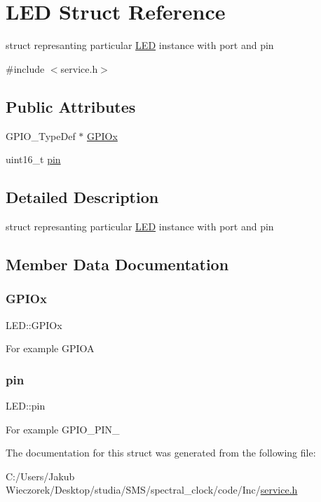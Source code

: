 \hypertarget{struct_l_e_d}{}\section{L\+ED Struct Reference}
\label{struct_l_e_d}


struct represanting particular \mbox{\hyperlink{struct_l_e_d}{L\+ED}} instance with port and pin  




{\ttfamily \#include $<$service.\+h$>$}

\subsection*{Public Attributes}
\begin{DoxyCompactItemize}
\item 
G\+P\+I\+O\+\_\+\+Type\+Def $\ast$ \mbox{\hyperlink{struct_l_e_d_a51708b925722c5a1d7360826fe72a9ab}{G\+P\+I\+Ox}}
\item 
uint16\+\_\+t \mbox{\hyperlink{struct_l_e_d_aead8c9f9715ef925eafc34151b6fbdfb}{pin}}
\end{DoxyCompactItemize}


\subsection{Detailed Description}
struct represanting particular \mbox{\hyperlink{struct_l_e_d}{L\+ED}} instance with port and pin 

\subsection{Member Data Documentation}
\mbox{\label{struct_l_e_d_a51708b925722c5a1d7360826fe72a9ab}} 
\subsubsection{\texorpdfstring{G\+P\+I\+Ox}{GPIOx}}
{\footnotesize\ttfamily L\+E\+D\+::\+G\+P\+I\+Ox}

For example G\+P\+I\+OA \mbox{\label{struct_l_e_d_aead8c9f9715ef925eafc34151b6fbdfb}} 
\subsubsection{\texorpdfstring{pin}{pin}}
{\footnotesize\ttfamily L\+E\+D\+::pin}

For example G\+P\+I\+O\+\_\+\+P\+I\+N\+\_ 

The documentation for this struct was generated from the following file\+:\begin{DoxyCompactItemize}
\item 
C\+:/\+Users/\+Jakub Wieczorek/\+Desktop/studia/\+S\+M\+S/spectral\+\_\+clock/code/\+Inc/\mbox{\hyperlink{service_8h}{service.\+h}}\end{DoxyCompactItemize}
